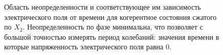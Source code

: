 \begin{figure}
\centering



\caption{Область неопределенности и соответствующее им зависимость
  электрического поля от времени для когерентное состояния сжатого по
  $X_2$. Неопределенность по фазе минимальна, что позволяет с большой
  точностью измерять период колебаний: значения времени в которые
  напряженность электрического поля равна 0.}
\label{figPart3Squeezed_3}
\end{figure}
